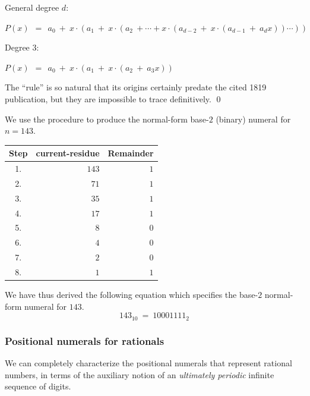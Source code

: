 \medskip


\noindent General degree $d$:

$P(x) \ \ = \ \ a_0 \ + \ x \cdot (a_1 \ + \ x \cdot (a_2  \ +  \cdots
+ x \cdot (a_{d-2} \ + \ x \cdot (a_{d-1} \ + \ a_d x)) \cdots ))$  

\noindent Degree $3$:

$P(x) \ \ = \ \ a_0 \ + \ x \cdot (a_1 \ + \ x \cdot (a_2  \ + \ a_3 x))$ 

\medskip

The ``rule'' is so natural that its origins certainly predate the
cited 1819 publication, but they are impossible to trace definitively.  \qed 

\bigskip

We use the procedure to produce the normal-form base-$2$ (binary)
numeral for $n = 143$.

\medskip

\begin{tabular}{|c|r|r|}
\hline
Step &
{\sc current-residue} &
Remainder \\
\hline
1. & $143$ & $1$ \\
2. & $71$  & $1$ \\
3. & $35$  & $1$ \\
4. & $17$  & $1$ \\
5. & $8$   & $0$ \\
6. & $4$   & $0$ \\
7. & $2$   & $0$ \\
8. & $1$   & $1$ \\
\hline
\end{tabular}

\medskip

\noindent
We have thus derived the following equation which specifies the
base-$2$ normal-form numeral for $143$.
\[ 143_{10} \ = \ 10001111_2 \]


\subsubsection{Positional numerals for rationals}
\label{sec:special-numerals-Q}

We can completely characterize the positional numerals that represent
rational numbers, in terms of the auxiliary notion of an {\em ultimately
  periodic} infinite sequence of digits.

